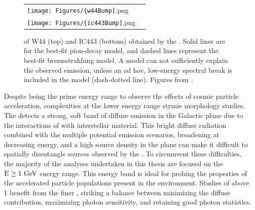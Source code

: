 \begin{figure}[h!]
	\begin{center}
		\begin{tabular}{ll}
			\texttt{[image: Figures/\{w44Bump]}.png} \\
			\texttt{[image: Figures/\{ic443Bump]}.png} \\
		\end{tabular}
	\end{center}
	\caption[\gam{} SEDs of SNRs W44 and IC443 obtained with the \lat{}]{\gam{} \seds{} of \snrs{} W44 (top) and IC443 (bottom) obtained by the \lat{}. Solid lines are for the best-fit pion-decay model, and dashed lines represent the best-fit bremsstrahlung model. A \brems{} model can not sufficiently explain the observed \gam{} emission, unless an ad hoc, low-energy spectral break is included in the \brems{} model (dash-dotted line). Figures from \cite{W44pion}.
		\label{fig:pionBump}
	}
\end{figure}

	







Despite being the prime energy range to observe the effects of cosmic particle acceleration, complexities at the lower \lat{} energy range stymie \snr{} morphology studies. The \lat{} detects a strong, soft band of diffuse emission in the Galactic plane due to the interactions of \crs{} with interstellar material. This bright diffuse radiation combined with the multiple potential emission scenarios, broadening \psf{} at decreasing energy, and a high source density in the plane can make it difficult to spatially disentangle sources observed by the \lat{}. To circumvent these 
difficulties, the majority of the analyses undertaken in this thesis are focused on the ${\rm E \geq 1~\mathrm{GeV}}$ energy range. This energy band is ideal for probing the properties of the accelerated particle populations present in the \snr{} environment. Studies of  \snrs{}  above 1\gev{} benefit from the finer \lat{} \psf{}, striking a balance between minimizing the diffuse contribution, maximizing photon sensitivity, and retaining good photon statistics.


